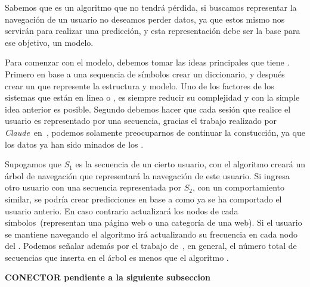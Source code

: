 % 

Sabemos que \lzSieteOcho es un algoritmo que no tendrá pérdida, si buscamos representar la navegación de un usuario no deseamos perder datos, ya que estos mismo nos servirán para realizar una predicción, y esta representación debe ser la base para ese objetivo, un modelo.

Para comenzar con el modelo, debemos tomar las ideas principales que tiene \lzSieteOcho. Primero en base a una sequencia de símbolos crear un diccionario, y después crear un \trie que represente la estructura y modelo. Uno de los factores de los sistemas que están en linea o \webs, es siempre reducir su complejidad y con la simple idea anterior es posible. Segundo debemos hacer que cada sesión que realice el usuario es representado por una secuencia, gracias el trabajo realizado por \emph{Claude}~\etal en~\cite{Claude2014}, podemos solamente preocuparnos de continuar la constucción, ya que los datos ya han sido minados de los \webasccesslog.



Supogamos que $S_{1}$ es la secuencia de un cierto usuario, con el  algoritmo \lzSieteOcho creará un árbol de navegación que representará la navegación de este usuario. Si ingresa otro usuario con una secuencia representada por $S_{2}$, con un comportamiento similar, se podría crear predicciones en base a como ya se ha comportado el usuario anterio. En caso contrario actualizará los nodos de cada símbolos~(representan una página web o una categoría de una web). Si el usuario se mantiene navegando el algoritmo irá actualizando su frecuencia en cada nodo del \trie. Podemos señalar además por el trabajo de~\cite{Begleiter2004}, en general, el número total de secuencias que inserta en el árbol es menos que el algoritmo \PPM.  








\textbf{CONECTOR pendiente a la siguiente subseccion}